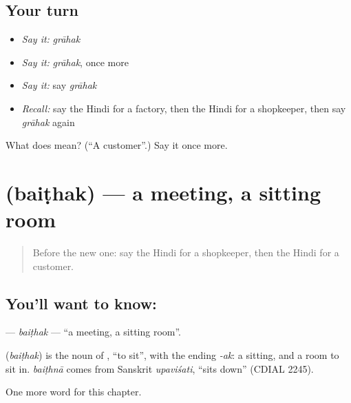 \subsection*{Your turn}
\begin{itemize}
\raggedright
  \item \emph{Say it:} \emph{grāhak}
  \item \emph{Say it:} \emph{grāhak}, once more
  \item \emph{Say it:} say \emph{grāhak}
  \item \emph{Recall:} say the Hindi for a factory, then the Hindi for a shopkeeper, then say \emph{grāhak} again
\end{itemize}

\begin{tcolorbox}[breakable,colback=teal!4,colframe=teal!35!black,title={Before you move on}]
What does  mean? (\textquotedblleft{}A customer\textquotedblright{}.) Say it once more.
\end{tcolorbox}
\section[\texorpdfstring{\hi{बैठक} (baiṭhak)}{बैठक (baiṭhak)}]{ (baiṭhak) — a meeting, a sitting room}

\label{lesson:HI-C183-baithak}



\begin{quote}
Before the new one: say the Hindi for a shopkeeper, then the Hindi for a customer.
\end{quote}

\subsection*{You'll want to know: }
\textbf{} — \emph{baiṭhak} — \textquotedblleft{}a meeting, a sitting room\textquotedblright{}.

\begin{cousinweb}
\textbf{} (\emph{baiṭhak}) is the noun of \textbf{}, \textquotedblleft{}to sit\textquotedblright{}, with the ending \emph{-ak}: a sitting, and a room to sit in. \emph{baiṭhnā} comes from Sanskrit \emph{upaviśati}, \textquotedblleft{}sits down\textquotedblright{} (CDIAL 2245).
\end{cousinweb}

\begin{grammarlens}[title={What you've built}]
One more word for this chapter.
\end{grammarlens}

